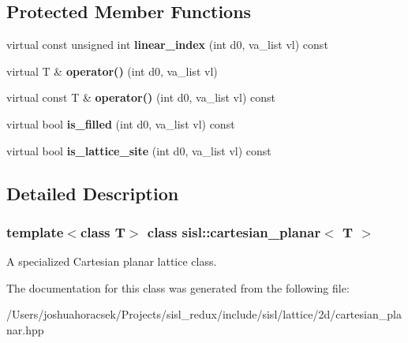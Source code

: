 \subsection*{Protected Member Functions}
\begin{DoxyCompactItemize}
\item 
\mbox{\label{classsisl_1_1cartesian__planar_a2091fb860fcb63177a2c8916a39c6bf9}} 
virtual const unsigned int {\bfseries linear\+\_\+index} (int d0, va\+\_\+list vl) const
\item 
\mbox{\label{classsisl_1_1cartesian__planar_aa257a635acd3a8dc75366147068b05af}} 
virtual T \& {\bfseries operator()} (int d0, va\+\_\+list vl)
\item 
\mbox{\label{classsisl_1_1cartesian__planar_a935f45a08742e35d1e159eb35e014f58}} 
virtual const T \& {\bfseries operator()} (int d0, va\+\_\+list vl) const
\item 
\mbox{\label{classsisl_1_1cartesian__planar_a4ee4fd317136a64eac6353a7bfc8a2cd}} 
virtual bool {\bfseries is\+\_\+filled} (int d0, va\+\_\+list vl) const
\item 
\mbox{\label{classsisl_1_1cartesian__planar_a0f48cf84a1070fc116468c7631207fdd}} 
virtual bool {\bfseries is\+\_\+lattice\+\_\+site} (int d0, va\+\_\+list vl) const
\end{DoxyCompactItemize}


\subsection{Detailed Description}
\subsubsection*{template$<$class T$>$\newline
class sisl\+::cartesian\+\_\+planar$<$ T $>$}

A specialized Cartesian planar lattice class. 

The documentation for this class was generated from the following file\+:\begin{DoxyCompactItemize}
\item 
/\+Users/joshuahoracsek/\+Projects/sisl\+\_\+redux/include/sisl/lattice/2d/cartesian\+\_\+planar.\+hpp\end{DoxyCompactItemize}
